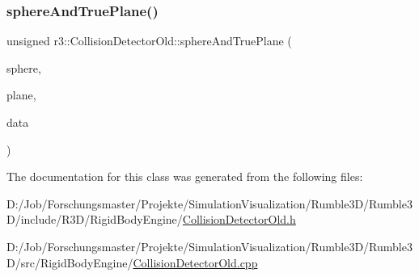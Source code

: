 \mbox{\label{classr3_1_1_collision_detector_old_ac193fb110bfd2618ed61aa59b72c6877}} 
\subsubsection{\texorpdfstring{sphere\+And\+True\+Plane()}{sphereAndTruePlane()}}
{\footnotesize\ttfamily unsigned r3\+::\+Collision\+Detector\+Old\+::sphere\+And\+True\+Plane (\begin{DoxyParamCaption}\item[{const \mbox{\hyperlink{classr3_1_1_collision_sphere}{Collision\+Sphere}} \&}]{sphere,  }\item[{const \mbox{\hyperlink{classr3_1_1_collision_plane}{Collision\+Plane}} \&}]{plane,  }\item[{\mbox{\hyperlink{classr3_1_1_collision_data_old}{Collision\+Data\+Old}} $\ast$}]{data }\end{DoxyParamCaption})\hspace{0.3cm}{\ttfamily [static]}}



The documentation for this class was generated from the following files\+:\begin{DoxyCompactItemize}
\item 
D\+:/\+Job/\+Forschungsmaster/\+Projekte/\+Simulation\+Visualization/\+Rumble3\+D/\+Rumble3\+D/include/\+R3\+D/\+Rigid\+Body\+Engine/\mbox{\hyperlink{_collision_detector_old_8h}{Collision\+Detector\+Old.\+h}}\item 
D\+:/\+Job/\+Forschungsmaster/\+Projekte/\+Simulation\+Visualization/\+Rumble3\+D/\+Rumble3\+D/src/\+Rigid\+Body\+Engine/\mbox{\hyperlink{_collision_detector_old_8cpp}{Collision\+Detector\+Old.\+cpp}}\end{DoxyCompactItemize}
